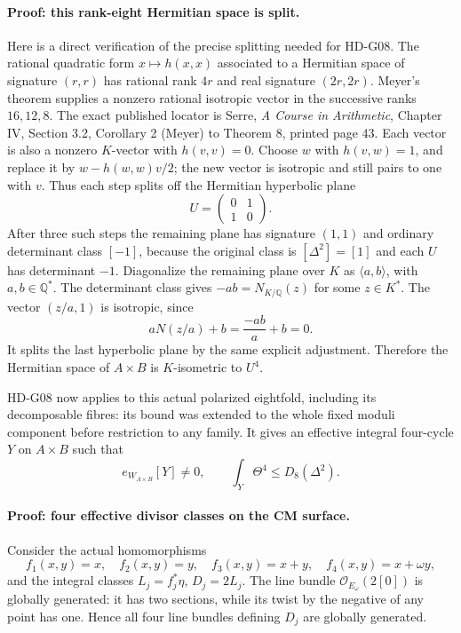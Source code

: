\paragraph{Proof: this rank-eight Hermitian space is split.}
Here is a direct verification of the precise splitting needed for
HD-G08. The rational quadratic form $x\mapsto h(x,x)$ associated
to a Hermitian space of signature $(r,r)$ has rational rank $4r$
and real signature $(2r,2r)$. Meyer's theorem supplies a nonzero
rational isotropic vector in the successive ranks $16,12,8$.
The exact published locator is Serre, \emph{A Course in Arithmetic},
Chapter IV, Section 3.2, Corollary 2 (Meyer) to Theorem 8,
printed page 43.
Each vector is also a nonzero $K$-vector with $h(v,v)=0$.
Choose $w$ with $h(v,w)=1$, and replace it by
$w-h(w,w)v/2$; the new vector is isotropic and still pairs to one
with $v$. Thus each step splits off the Hermitian hyperbolic plane
\[
U=\begin{pmatrix}0&1\\1&0\end{pmatrix}.
\]
After three such steps the remaining plane has signature $(1,1)$
and ordinary determinant class $[-1]$, because the original class
is $[\Delta^2]=[1]$ and each $U$ has determinant $-1$.
Diagonalize the remaining plane over $K$ as $\langle a,b\rangle$,
with $a,b\in\mathbb Q^*$. The determinant class gives
$-ab=N_{K/\mathbb Q}(z)$ for some $z\in K^*$. The vector
$(z/a,1)$ is isotropic, since
\[
aN(z/a)+b=\frac{-ab}{a}+b=0.
\]
It splits the last hyperbolic plane by the same explicit adjustment.
Therefore the Hermitian space of $A\times B$ is $K$-isometric to
$U^4$.

HD-G08 now applies to this actual polarized eightfold, including its
decomposable fibres: its bound was extended to the whole fixed moduli
component before restriction to any family. It gives an effective
integral four-cycle $Y$ on $A\times B$ such that
\[
e_{W_{A\times B}}[Y]\ne0,
\qquad
\int_Y\Theta^4\le D_8(\Delta^2).
\tag{G10.4}
\]

\paragraph{Proof: four effective divisor classes on the CM surface.}
Consider the actual homomorphisms
\[
f_1(x,y)=x,\quad f_2(x,y)=y,\quad
f_3(x,y)=x+y,\quad f_4(x,y)=x+\omega y,
\]
and the integral classes $L_j=f_j^*\eta$, $D_j=2L_j$.
The line bundle $\mathcal O_{E_\omega}(2[0])$ is globally generated:
it has two sections, while its twist by the negative of any point
has one. Hence all four line bundles defining $D_j$ are globally
generated.

